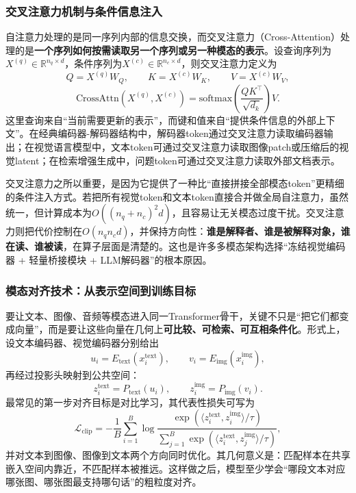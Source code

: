 \documentclass[12pt,a4paper]{article}
\begin{document}
\subsubsection{交叉注意力机制与条件信息注入}

自注意力处理的是同一序列内部的信息交换，而交叉注意力（Cross-Attention）处理的是\textbf{一个序列如何按需读取另一个序列或另一种模态的表示}。设查询序列为$X^{(q)} \in \mathbb{R}^{n_q \times d}$，条件序列为$X^{(c)} \in \mathbb{R}^{n_c \times d}$，则交叉注意力定义为
\begin{equation}
Q = X^{(q)} W_Q,\qquad K = X^{(c)} W_K,\qquad V = X^{(c)} W_V,
\end{equation}
\begin{equation}
\text{CrossAttn}(X^{(q)}, X^{(c)}) = \text{softmax}\left(\frac{QK^\top}{\sqrt{d_k}}\right)V.
\end{equation}
这里查询来自“当前需要更新的表示”，而键和值来自“提供条件信息的外部上下文”。在经典编码器-解码器结构中，解码器token通过交叉注意力读取编码器输出；在视觉语言模型中，文本token可通过交叉注意力读取图像patch或压缩后的视觉latent；在检索增强生成中，问题token可通过交叉注意力读取外部文档表示。

交叉注意力之所以重要，是因为它提供了一种比“直接拼接全部模态token”更精细的条件注入方式。若把所有视觉token和文本token直接合并做全局自注意力，虽然统一，但计算成本为$O((n_q+n_c)^2 d)$，且容易让无关模态过度干扰。交叉注意力则把代价控制在$O(n_q n_c d)$，并保持方向性：\textbf{谁是解释者、谁是被解释对象，谁在读、谁被读}，在算子层面是清楚的。这也是许多多模态架构选择“冻结视觉编码器 + 轻量桥接模块 + LLM解码器”的根本原因。

\subsubsection{模态对齐技术：从表示空间到训练目标}

要让文本、图像、音频等模态进入同一Transformer骨干，关键不只是“把它们都变成向量”，而是要让这些向量在几何上\textbf{可比较、可检索、可互相条件化}。形式上，设文本编码器、视觉编码器分别给出
\begin{equation}
u_i = E_{\text{text}}(x_i^{\text{text}}),\qquad
v_i = E_{\text{img}}(x_i^{\text{img}}),
\end{equation}
再经过投影头映射到公共空间：
\begin{equation}
z_i^{\text{text}} = P_{\text{text}}(u_i),\qquad
z_i^{\text{img}} = P_{\text{img}}(v_i).
\end{equation}
最常见的第一步对齐目标是对比学习，其代表性损失可写为
\begin{equation}
\mathcal{L}_{\text{clip}} =
- \frac{1}{B}\sum_{i=1}^{B}
\log
\frac{\exp(\langle z_i^{\text{text}}, z_i^{\text{img}}\rangle/\tau)}
{\sum_{j=1}^{B}\exp(\langle z_i^{\text{text}}, z_j^{\text{img}}\rangle/\tau)},
\end{equation}
并对文本到图像、图像到文本两个方向同时优化。其几何意义是：匹配样本在共享嵌入空间内靠近，不匹配样本被推远。这样做之后，模型至少学会“哪段文本对应哪张图、哪张图最支持哪句话”的粗粒度对齐。
\end{document}
